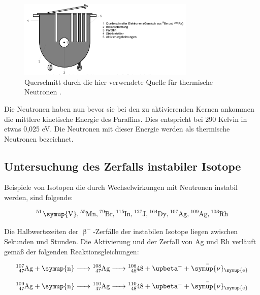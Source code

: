 \begin{figure}[H]
   \centering
   \includegraphics[width=0.75\textwidth]{images/Theorie1.PNG}
   \caption{Querschnitt durch die hier verwendete Quelle für thermische Neutronen \protect \cite{V702}.}
   \label{img:Paraffin}
\end{figure}

\noindent Die Neutronen haben nun bevor sie bei den zu aktivierenden Kernen ankommen die mittlere kinetische Energie des Paraffins. Dies entspricht 
bei 290 Kelvin in etwas 0,025 eV. Die Neutronen mit dieser Energie werden als thermische Neutronen bezeichnet. 

\subsection{Untersuchung des Zerfalls instabiler Isotope}

\noindent Beispiele von Isotopen die durch Wechselwirkungen mit Neutronen instabil werden, sind folgende:

\begin{equation*}
   \ce{^{51} \symup{V}, ^{55}\text{Mn}, ^{79}\text{Br}, ^{115}\text{In}, ^{127}\text{J}, ^{164}\text{Dy}, ^{107}{Ag}, ^{109}\text{Ag}, ^{103}\text{Rh}} \nonumber
\end{equation*}

\noindent Die Halbwertszeiten der $\upbeta ^-$-Zerfälle der instabilen Isotope liegen zwischen Sekunden und Stunden. Die Aktivierung und der 
Zerfall von Ag und Rh verläuft gemäß der folgenden Reaktionsgleichungen:

\begin{equation}
   \ce{^{107}_{47}\text{Ag} + \symup{n} -> ^{108}_{47}\text{Ag} -> ^{108}_{48}\text{48} + $\upbeta$^- + \bar{\symup{\nu}}_{\symup{e}}} 
   \label{eq:Ag107}
\end{equation}

\begin{equation}
   \ce{^{109}_{47}\text{Ag} + \symup{n} -> ^{110}_{47}\text{Ag} -> ^{110}_{48}\text{48} + $\upbeta$^- + \bar{\symup{\nu}}_{\symup{e}}}
    \label{eq:Ag109} 
\end{equation}

